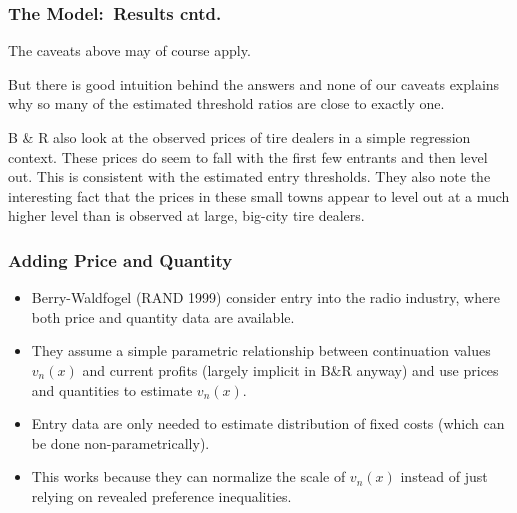 \documentclass[aspectratio=169,11pt]{beamer}
\begin{document}
\begin{frame}
\frametitle{The Model:\ Results cntd.}
The caveats above may of course apply.

\bigskip
But there is good intuition behind the answers and none of our caveats
explains why so many of the estimated threshold ratios are close to exactly
one.

\bigskip
B \& R also look at the observed prices of tire dealers in a simple
regression context. These prices do seem to fall with the first few entrants
and then level out. This is consistent with the estimated entry thresholds.
They also note the interesting fact that the prices in these small towns
appear to level out at a much higher level than is observed at large,
big-city tire dealers.
\end{frame}

\begin{frame} \frametitle{Adding Price and Quantity}
\begin{itemize}
\item Berry-Waldfogel (RAND 1999) consider entry into the radio industry,
where both price and quantity data are available.
\item They assume a simple parametric relationship between continuation
values $v_n(x)$ and current profits (largely implicit in B\&R anyway) and use
prices and quantities to estimate $v_n(x)$.
\item Entry data are only needed to estimate distribution of fixed costs (which can be done non-parametrically).
\item This works because they can normalize the scale of $v_n(x)$ instead of just relying on revealed preference inequalities.
\end{itemize}
\end{frame}
\end{document}
